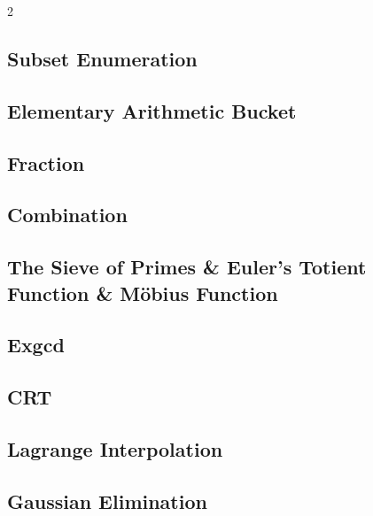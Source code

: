 \documentclass[10pt,a4paper]{article}
\begin{document}
\begin{multicols}{2}
\subsection{Subset Enumeration}



\subsection{Elementary Arithmetic Bucket}



\subsection{Fraction}



\subsection{Combination}



\subsection{The Sieve of Primes \& Euler's Totient Function \& Möbius Function}



\subsection{Exgcd}



\subsection{CRT}



\subsection{Lagrange Interpolation}



\subsection{Gaussian Elimination}


\end{multicols}
\end{document}
